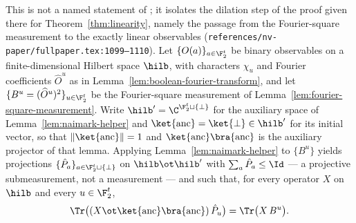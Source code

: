 \begin{lemma}
	\label{lem:naimark-rounding}
	\leanok
	This is not a named statement of \cite{Natarajan2017Linearity}; it isolates
	the dilation step of the proof given there for
	Theorem~\ref{thm:linearity}, namely the passage from the Fourier-square
	measurement to the exactly linear observables
	(\texttt{references/nv-paper/fullpaper.tex:1099--1110}). Let
	$\{O(a)\}_{a \in \F_2^t}$ be binary observables on a finite-dimensional
	Hilbert space $\hilb$, with characters $\chi_u$ and Fourier coefficients
	$\widehat{O}^u$ as in Lemma~\ref{lem:boolean-fourier-transform}, and let
	$\{B^u = (\widehat{O}^u)^2\}_{u \in \F_2^t}$ be the Fourier-square
	measurement of Lemma~\ref{lem:fourier-square-measurement}. Write
	$\hilb' = \C^{\F_2^t \sqcup \{\bot\}}$ for the auxiliary space of
	Lemma~\ref{lem:naimark-helper} and
	$\ket{\mathrm{anc}} = \ket{\bot} \in \hilb'$ for its initial vector, so
	that $\|\ket{\mathrm{anc}}\| = 1$ and
	$\ket{\mathrm{anc}}\bra{\mathrm{anc}}$ is the auxiliary projector of that
	lemma. Applying Lemma~\ref{lem:naimark-helper} to $\{B^u\}$ yields
	projections $\{\hat{P}_a\}_{a \in \F_2^t \sqcup \{\bot\}}$ on
	$\hilb \ot \hilb'$ with $\sum_a \hat{P}_a \le \Id$ --- a projective
	submeasurement, not a measurement --- and such that, for every operator
	$X$ on $\hilb$ and every $u \in \F_2^t$,
	\[
		\Tr\big((X \ot \ket{\mathrm{anc}}\bra{\mathrm{anc}}) \, \hat{P}_u\big)
		= \Tr\big(X \, B^u\big) .
\]
\end{lemma}
